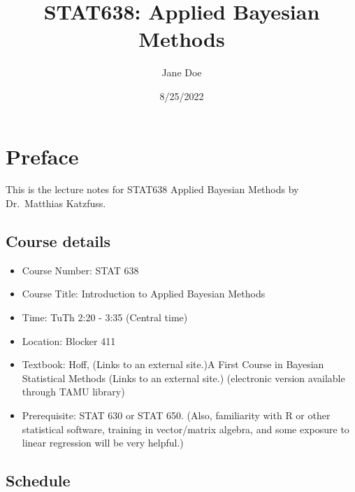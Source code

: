 \documentclass[
  letterpaper,
  DIV=11,
  numbers=noendperiod]{scrreprt}
\title{STAT638: Applied Bayesian Methods}
\author{Jane Doe}
\date{8/25/2022}
\providecommand{\tightlist}{%
  \setlength{\itemsep}{0pt}\setlength{\parskip}{0pt}}\usepackage{longtable,booktabs,array}
\renewcommand*\contentsname{Table of contents}
\newcommand\contentsname{Table of contents}
\begin{document}
\maketitle
\ifdefined\Shaded\renewenvironment{Shaded}{\begin{tcolorbox}[enhanced, interior hidden, boxrule=0pt, borderline west={3pt}{0pt}{shadecolor}, breakable, sharp corners, frame hidden]}{\end{tcolorbox}}\fi

\renewcommand*\contentsname{Table of contents}
{
\hypersetup{linkcolor=}
\setcounter{tocdepth}{2}
\tableofcontents
}

\hypertarget{preface}{%
\chapter*{Preface}\label{preface}}

This is the lecture notes for STAT638 Applied Bayesian Methods by
Dr.~Matthias Katzfuss.

\hypertarget{course-details}{%
\section*{Course details}\label{course-details}}

\begin{itemize}
\tightlist
\item
  Course Number: STAT 638
\item
  Course Title: Introduction to Applied Bayesian Methods
\item
  Time: TuTh 2:20 - 3:35 (Central time)
\item
  Location: Blocker 411
\item
  Textbook: Hoff, (Links to an external site.)A First Course in Bayesian
  Statistical Methods (Links to an external site.) (electronic version
  available through TAMU library)
\item
  Prerequisite: STAT 630 or STAT 650. (Also, familiarity with R or other
  statistical software, training in vector/matrix algebra, and some
  exposure to linear regression will be very helpful.)
\end{itemize}

\hypertarget{schedule}{%
\section*{Schedule}\label{schedule}}
\end{document}
